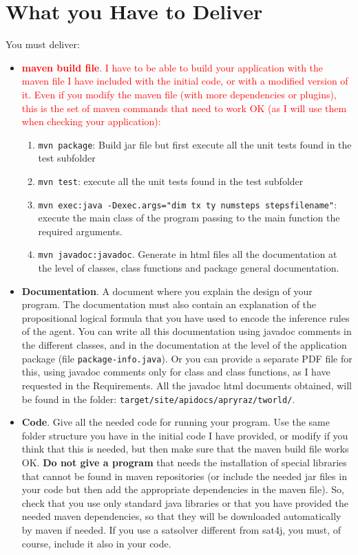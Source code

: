 \documentclass{tufte-handout}
\begin{document}
\section{What you Have to Deliver}

\begin{fullwidth}
You must deliver:
\begin{itemize}
\item  \textcolor{red}{{\bf maven build file}. I have to be able to build your
 application with the maven file I have included with the initial
 code, or with a modified version of it. Even if you modify the maven
 file (with more dependencies or plugins), this is the set of maven commands that
 need to work OK (as I will use them when checking your application):}
\begin{enumerate}
  \item {\tt mvn package}: Build jar file but first execute all the unit tests found in the test
  subfolder
   \item {\tt mvn test}: execute all the unit tests found in the test
   subfolder
  \item {\tt mvn exec:java -Dexec.args="dim tx ty numsteps stepsfilename"}: execute the main
  class of the program passing to the main function the required arguments.
  \item {\tt mvn javadoc:javadoc}. Generate in html files all the documentation at the level
  of classes, class functions and package general documentation.
\end{enumerate}
\item {\bf Documentation}. A document where you explain the
design of your program.
The documentation must also contain an explanation of the
propositional logical formula  that you have used to
encode the inference rules of the agent. You can write all this
documentation using javadoc comments in the different classes, and in the
documentation at the level of the application package (file {\tt package-info.java}).
Or you can provide a separate PDF file for this, using javadoc comments
only for class and class functions, as I have requested in the Requirements.
All the javadoc html documents obtained, will be found in the folder:
{\tt target/site/apidocs/apryraz/tworld/}.
\item {\bf Code}. Give all the needed code for running your
program. Use the same folder structure you have in the initial code I have provided,
or modify if you think that this is needed, but then make sure that the maven build file works
OK. {\bf Do not give a program} that needs the installation of
special  libraries that cannot be found in maven repositories (or include
the needed jar files in your code but then add the appropriate dependencies in the
maven file). So, check that you use only standard  java libraries  or that you have
 provided the needed maven dependencies, so that they will be downloaded
automatically by maven if needed.
If you use a satsolver different from sat4j, you must, of course, include it also in
your code.
\end{itemize}
\end{fullwidth}
\end{document}
